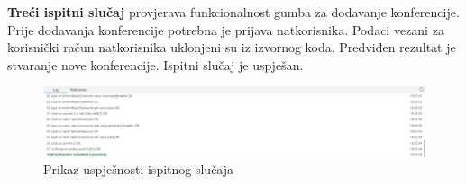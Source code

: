 \textbf{Treći ispitni slučaj} provjerava funkcionalnost gumba za dodavanje konferencije. Prije dodavanja konferencije potrebna je prijava natkorisnika. Podaci vezani za korisnički račun natkorisnika uklonjeni su iz izvornog koda. Predviđen rezultat  je stvaranje nove konferencije. Ispitni slučaj je uspješan.

\begin{figure} [hbt!]
	\includegraphics[width=\linewidth]{Slike/addConferention}
	\caption{Prikaz uspješnosti ispitnog slučaja}
\end{figure}

